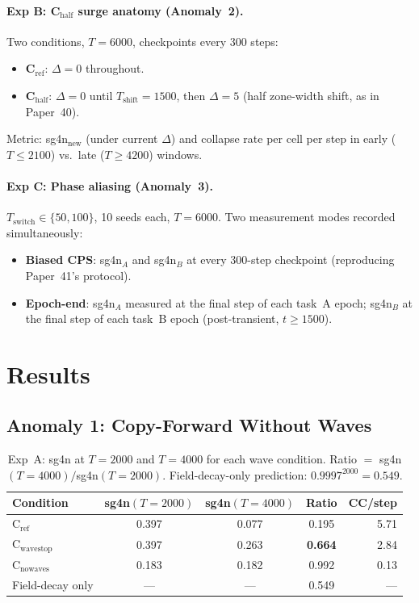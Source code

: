 \documentclass[11pt]{article}
\begin{document}
\paragraph{Exp B: C$_\mathrm{half}$ surge anatomy (Anomaly~2).}
Two conditions, $T=6000$, checkpoints every 300 steps:
\begin{itemize}
  \item \textbf{C$_\mathrm{ref}$}: $\Delta=0$ throughout.
  \item \textbf{C$_\mathrm{half}$}: $\Delta=0$ until $T_\mathrm{shift}=1500$,
        then $\Delta=5$ (half zone-width shift, as in Paper~40).
\end{itemize}
Metric: sg4n$_\mathrm{new}$ (under current $\Delta$) and collapse rate per
cell per step in early ($T \leq 2100$) vs.\ late ($T \geq 4200$) windows.

\paragraph{Exp C: Phase aliasing (Anomaly~3).}
$T_\mathrm{switch}\in\{50,100\}$, 10 seeds each, $T=6000$.
Two measurement modes recorded simultaneously:
\begin{itemize}
  \item \textbf{Biased CPS}: sg4n$_A$ and sg4n$_B$ at every 300-step
        checkpoint (reproducing Paper~41's protocol).
  \item \textbf{Epoch-end}: sg4n$_A$ measured at the final step of each
        task~A epoch; sg4n$_B$ at the final step of each task~B epoch
        (post-transient, $t \geq 1500$).
\end{itemize}

\section{Results}

\subsection{Anomaly 1: Copy-Forward Without Waves}

\begin{table}[h]
  \centering
  \caption{Exp~A: sg4n at $T=2000$ and $T=4000$ for each wave condition.
           Ratio $= $ sg4n$(T=4000)/$sg4n$(T=2000)$.
           Field-decay-only prediction: $0.9997^{2000}=0.549$.}
  \label{tab:expa}
  \small
  \begin{tabular}{lcccr}
    \toprule
    Condition & sg4n$(T=2000)$ & sg4n$(T=4000)$ & Ratio & CC/step \\
    \midrule
    C$_\mathrm{ref}$      & 0.397 & 0.077 & 0.195 & 5.71 \\
    C$_\mathrm{wavestop}$ & 0.397 & 0.263 & \textbf{0.664} & 2.84 \\
    C$_\mathrm{nowaves}$  & 0.183 & 0.182 & 0.992 & 0.13 \\
    \midrule
    Field-decay only & --- & --- & 0.549 & --- \\
    \bottomrule
  \end{tabular}
\end{table}
\end{document}
